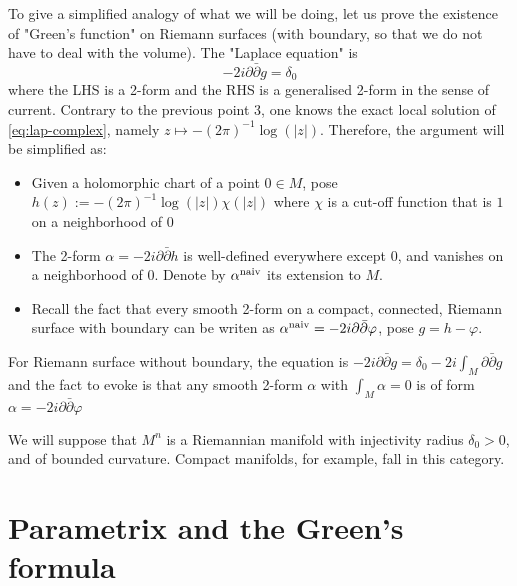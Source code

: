 \begin{remark}
\label{rem:green-riem-surf}
To give a simplified analogy of what we will be doing, let us prove the existence of
"Green's function" on Riemann surfaces (with boundary, so that we do not have to deal with
the volume). The "Laplace equation" is
\begin{equation}
\label{eq:lap-complex}
-2i \partial \bar \partial g = \delta_0
\end{equation}
where the LHS is a 2-form and the RHS is a generalised 2-form in the sense of
current. Contrary to the previous point 3, one knows the exact local solution of
\eqref{eq:lap-complex}, namely \(z\mapsto -(2\pi)^{-1}\log(|z|)\). Therefore, the argument
will be simplified as:
\begin{itemize}
\item Given a holomorphic chart of a point \(0\in M\), pose \(h(z):= -(2\pi)^{-1}\log(|z|)\chi(|z|)\) where \(\chi\) is a cut-off function that
is \(1\) on a neighborhood of \(0\)
\item The 2-form \(\alpha=-2i \partial \bar \partial h\) is well-defined everywhere except \(0\), and vanishes on a neighborhood of \(0\). Denote by \(\alpha^{\rm naiv}\) its
extension to \(M\).
\item Recall the fact that every smooth 2-form on a compact, connected, Riemann surface with
boundary can be writen as \(\alpha^{\rm naiv} = -2i \partial \bar \partial \varphi\),
pose \(g = h-\varphi\).
\end{itemize}

For Riemann surface without boundary, the equation is
\(-2i \partial \bar \partial g = \delta_0 -2i\int_M \partial \bar \partial g\) and the
fact to evoke is that any smooth 2-form \(\alpha\) with \(\int_M \alpha = 0\) is of
form \(\alpha = -2i \partial \bar \partial \varphi\) 
\end{remark}

We will suppose that \(M^n\) is a Riemannian manifold with injectivity radius \(\delta_0
>0\), and of bounded curvature. Compact manifolds, for example, fall in this category.

\section{Parametrix and the Green's formula}
\label{sec:org49c865e}

